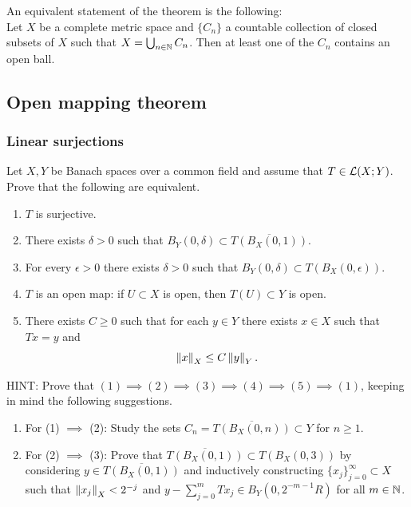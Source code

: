 \documentclass[a4paper]{article}
\begin{document}
\begin{remark}
    An equivalent statement of the theorem is the following: \\
    Let $X$ be a complete metric space and $\{C_n\}$ a countable
    collection of closed subsets of $X$ such that $X =
    \bigcup_{n \in \mathbb{N}} C_n $. Then at least one of the $C_n$
    contains an open ball.
\end{remark}

\subsection{Open mapping theorem}

\subsubsection*{Linear surjections}

\begin{thm}
Let $X,Y$ be Banach spaces over a common field and assume that
$T \in \mathcal{L}(X;Y)$.  Prove that the following are equivalent.
\begin{enumerate}
 \item $T$ is surjective.

 \item There exists $\delta >0$ such that $B_Y(0,\delta) \subset
 \overline{T(B_X(0,1))}$.

 \item For every $\epsilon >0$ there exists $\delta >0$
 such that $B_Y(0,\delta) \subset T(B_X(0,\epsilon))$.

 \item $T$ is an open map: if $U\subset X$ is open, then
 $T(U) \subset Y$ is open.

  \item There exists $C \ge 0$ such that for each $y \in Y$
  there exists $x \in X$ such that $Tx=y$ and
\[
 \left\lVert x\right\rVert_X \leq C \left\lVert y\right\rVert_Y.
\]
\end{enumerate}
HINT: Prove that  $(1) \implies (2) \implies (3)
\implies (4) \implies (5)  \implies (1)$, keeping
in mind the following suggestions.
\begin{enumerate}
 \item For (1) $\implies$ (2): Study the sets $C_n =
 \overline{T(B_X(0,n))} \subset Y$ for $n \ge 1$.
 \item For (2) $\implies$ (3):  Prove that
 $\overline{T(B_X(0,1)  )} \subset T(B_X(0,3))$
 by considering $y \in\overline{T(B_X(0,1)  )}$ and
 inductively constructing $\{x_j\}_{j=0}^\infty \subset X$
such that $\left\lVert x_j\right\rVert_X < 2^{-j}$ and
$y - \sum_{j=0}^m T x_j \in B_Y(0,2^{-m-1} R)$
for all $m \in \mathbb{N}$.
\end{enumerate}
\end{thm}
\end{document}
